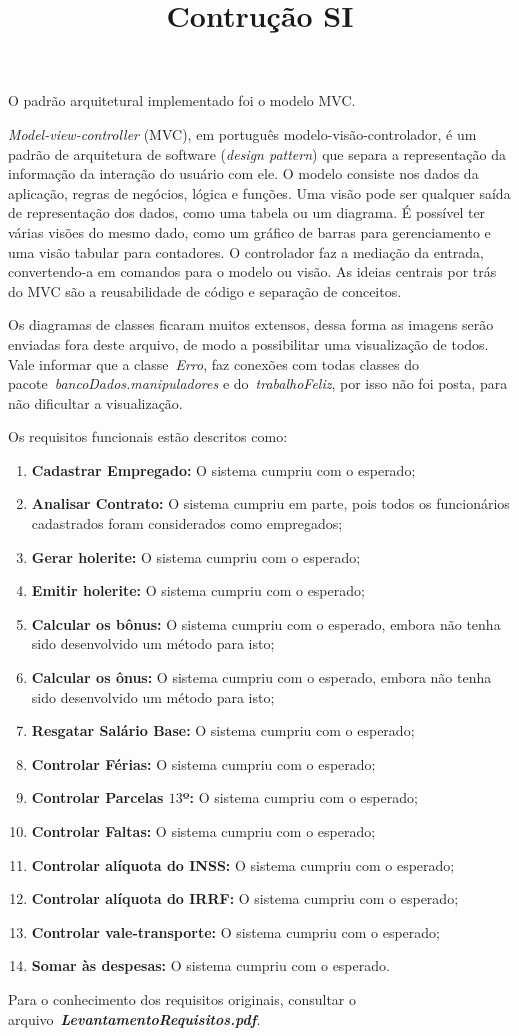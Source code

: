 \documentclass [12pt]{article}
\title {Contrução SI}
\begin{document}
	\inserirTitulo

	O padrão arquitetural implementado foi o modelo MVC.
	
	\emph{Model-view-controller} (MVC), em português modelo-visão-controlador, é um padrão de arquitetura de software (\emph{design pattern}) que separa a representação da informação da interação do usuário com ele. O modelo consiste nos dados da aplicação, regras de negócios, lógica e funções. Uma visão pode ser qualquer saída de representação dos dados, como uma tabela ou um diagrama. É possível ter várias visões do mesmo dado, como um gráfico de barras para gerenciamento e uma visão tabular para contadores. O controlador faz a mediação da entrada, convertendo-a em comandos para o modelo ou visão. As ideias centrais por trás do MVC são a reusabilidade de código e separação de conceitos.

	Os diagramas de classes ficaram muitos extensos, dessa forma as imagens serão enviadas fora deste arquivo, de modo a possibilitar uma visualização de todos. Vale informar que a classe~\emph{Erro}, faz conexões com todas classes do pacote~\emph{bancoDados.manipuladores} e do~\emph{trabalhoFeliz}, por isso não foi posta, para não dificultar a visualização.

	Os requisitos funcionais estão descritos como:
	
	\begin{enumerate}
		\item \textbf{Cadastrar Empregado:} O sistema cumpriu com o esperado;
		\item \textbf{Analisar Contrato:} O sistema cumpriu em parte, pois todos os funcionários cadastrados foram considerados como empregados;
		\item \textbf{Gerar holerite:} O sistema cumpriu com o esperado;
		\item \textbf{Emitir holerite:} O sistema cumpriu com o esperado;
		\item \textbf{Calcular os bônus:} O sistema cumpriu com o esperado, embora não tenha sido desenvolvido um método para isto;
		\item \textbf{Calcular os ônus:} O sistema cumpriu com o esperado, embora não tenha sido desenvolvido um método para isto;
		\item \textbf{Resgatar Salário Base:} O sistema cumpriu com o esperado;
		\item \textbf{Controlar Férias:} O sistema cumpriu com o esperado;
		\item \textbf{Controlar Parcelas $13$º:} O sistema cumpriu com o esperado;
		\item \textbf{Controlar Faltas:} O sistema cumpriu com o esperado;
		\item \textbf{Controlar alíquota do INSS:} O sistema cumpriu com o esperado;
		\item \textbf{Controlar alíquota do IRRF:} O sistema cumpriu com o esperado;
		\item \textbf{Controlar vale-transporte:} O sistema cumpriu com o esperado;
		\item \textbf{Somar às despesas:} O sistema cumpriu com o esperado.
	\end{enumerate}
	
	Para o conhecimento dos requisitos originais, consultar o arquivo~\emph{\textbf{LevantamentoRequisitos.pdf}}.
\end{document}
